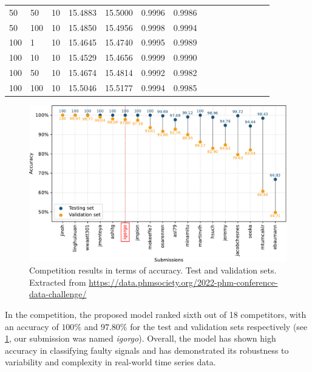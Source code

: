 \begin{longtable}{llr|rrrrrrrrrrrr}
    50 &              50 &                   10 &     15.4883 &    15.5000 &     0.9996 &    0.9986 \\
    50 &             100 &                   10 &     15.4850 &    15.4956 &     0.9998 &    0.9994 \\
    100 &               1 &                   10 &     15.4645 &    15.4740 &     0.9995 &    0.9989 \\
    100 &              10 &                   10 &     15.4529 &    15.4656 &     0.9999 &    0.9990 \\
    100 &              50 &                   10 &     15.4674 &    15.4814 &     0.9992 &    0.9982 \\
    100 &             100 &                   10 &     15.5046 &    15.5177 &     0.9994 &    0.9985 \\
\bottomrule
\end{longtable}
\endgroup
\normalsize


\begin{figure}[!htb]
    \begin{center}
    \centerline{\includegraphics[width=\linewidth]{figures/challenge_results-crop.pdf}}
    \caption{Competition results in terms of accuracy. Test and validation sets. Extracted from \url{https://data.phmsociety.org/2022-phm-conference-data-challenge/}}
    \label{fig:phm_results}
    \end{center}
\end{figure}


In the competition, the proposed model ranked sixth out of 18 competitors, with an accuracy of $100\%$ and $97.80\%$ for the test and validation sets respectively (see \cref{fig:phm_results}, our submission was named \textit{igorgo}). Overall, the model has shown high accuracy in classifying faulty signals and has demonstrated its robustness to variability and complexity in real-world time series data.


